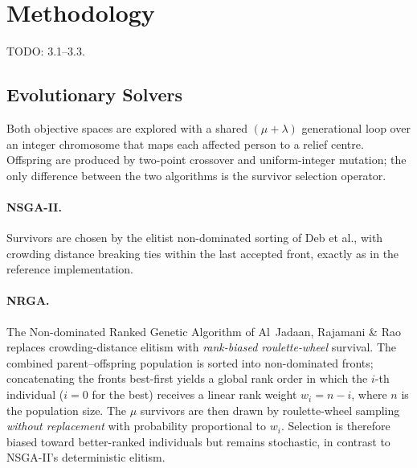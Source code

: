 \section{Methodology}
\label{sec:methodology}

%
%
%
%
%
%

TODO: 3.1--3.3.

\subsection{Evolutionary Solvers}
\label{sec:solvers}

Both objective spaces are explored with a shared $(\mu+\lambda)$ generational
loop over an integer chromosome that maps each affected person to a relief
centre. Offspring are produced by two-point crossover and uniform-integer
mutation; the only difference between the two algorithms is the survivor
selection operator.

\paragraph{NSGA-II.} Survivors are chosen by the elitist non-dominated sorting
of Deb et al., with crowding distance breaking ties within the last accepted
front, exactly as in the reference implementation.

\paragraph{NRGA.} The Non-dominated Ranked Genetic Algorithm of Al~Jadaan,
Rajamani \& Rao replaces crowding-distance elitism with \emph{rank-biased
roulette-wheel} survival. The combined parent--offspring population is sorted
into non-dominated fronts; concatenating the fronts best-first yields a global
rank order in which the $i$-th individual ($i=0$ for the best) receives a linear
rank weight $w_i = n - i$, where $n$ is the population size. The $\mu$ survivors
are then drawn by roulette-wheel sampling \emph{without replacement} with
probability proportional to $w_i$. Selection is therefore biased toward
better-ranked individuals but remains stochastic, in contrast to NSGA-II's
deterministic elitism.

